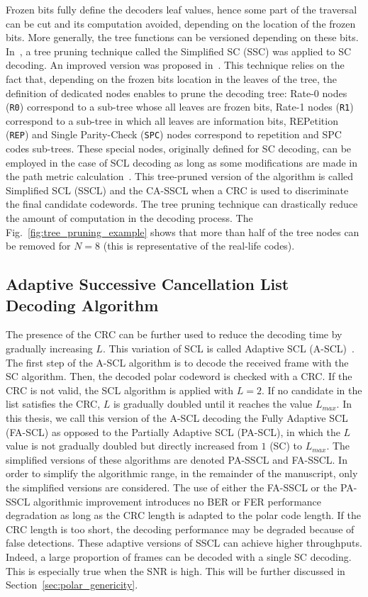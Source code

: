 Frozen bits fully define the decoders leaf values, hence some part of the
traversal can be cut and its computation avoided, depending on the location of
the frozen bits. More generally, the tree functions can be versioned depending
on these bits. In~\cite{Alamdar-Yazdi2011}, a tree pruning technique called the
Simplified SC (SSC) was applied to SC decoding. An improved version was proposed
in~\cite{Sarkis2014a}. This technique relies on the fact that, depending on the
frozen bits location in the leaves of the tree, the definition of dedicated
nodes enables to prune the decoding tree: Rate-0 nodes (\verb|R0|) correspond to
a sub-tree whose all leaves are frozen bits, Rate-1 nodes (\verb|R1|) correspond
to a sub-tree in which all leaves are information bits, REPetition (\verb|REP|)
and Single Parity-Check (\verb|SPC|) nodes correspond to repetition and SPC
codes sub-trees. These special nodes, originally defined for SC decoding, can be
employed in the case of SCL decoding as long as some modifications are made in
the path metric calculation~\cite{Sarkis2016}. This tree-pruned version of the
algorithm is called Simplified SCL (SSCL) and the CA-SSCL when a CRC is used to
discriminate the final candidate codewords. The tree pruning technique can
drastically reduce the amount of computation in the decoding process. The
Fig.~\ref{fig:tree_pruning_example} shows that more than half of the tree nodes
can be removed for $N = 8$ (this is representative of the real-life codes).

\subsection{Adaptive Successive Cancellation List Decoding Algorithm}

The presence of the CRC can be further used to reduce the decoding time by
gradually increasing $L$. This variation of SCL is called Adaptive SCL
(A-SCL)~\cite{Li2012}. The first step of the A-SCL algorithm is to decode the
received frame with the SC algorithm. Then, the decoded polar codeword is
checked with a CRC. If the CRC is not valid, the SCL algorithm is applied with
$L=2$. If no candidate in the list satisfies the CRC, $L$ is gradually doubled
until it reaches the value $L_{max}$. In this thesis, we call this version of
the A-SCL decoding the Fully Adaptive SCL (FA-SCL) as opposed to the Partially
Adaptive SCL (PA-SCL), in which the $L$ value is not gradually doubled but
directly increased from $1$ (SC) to $L_{max}$. The simplified versions of these
algorithms are denoted PA-SSCL and FA-SSCL. In order to simplify the algorithmic
range, in the remainder of the manuscript, only the simplified versions are
considered. The use of either the FA-SSCL or the PA-SSCL algorithmic improvement
introduces no BER or FER performance degradation as long as the CRC length is
adapted to the polar code length. If the CRC length is too short, the decoding
performance may be degraded because of false detections. These adaptive versions
of SSCL can achieve higher throughputs. Indeed, a large proportion of frames can
be decoded with a single SC decoding. This is especially true when the SNR is
high. This will be further discussed in Section~\ref{sec:polar_genericity}.

